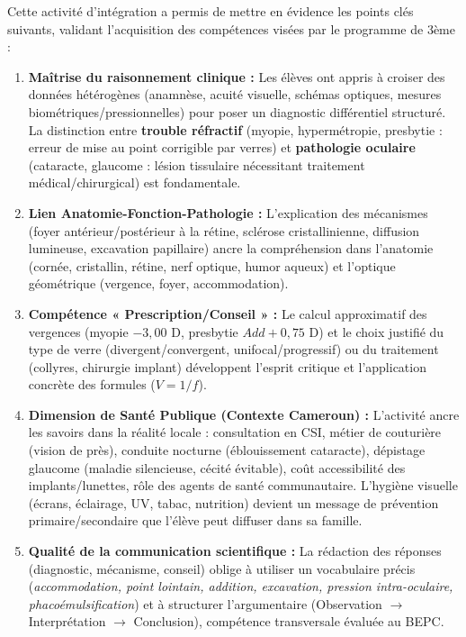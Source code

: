 \documentclass[11pt]{article}
\newcounter{popsec}
\newcounter{popsub}
\newcommand{\courssub}[1]{%
  \stepcounter{popsub}%
  \par\vspace{9pt}\noindent{\popxbold\fontsize{11.5}{13}\selectfont\color{popink}{\color{poporange}\thepopsec.\thepopsub}\hspace{6pt}#1}\par\nopagebreak\vspace{4pt}
}
\begin{document}
\courssub{Bilan de l'activité et Synthèse de la leçon}
Cette activité d'intégration a permis de mettre en évidence les points clés suivants, validant l'acquisition des compétences visées par le programme de 3ème :

\begin{enumerate}
    \item \textbf{Maîtrise du raisonnement clinique :} Les élèves ont appris à croiser des données hétérogènes (anamnèse, acuité visuelle, schémas optiques, mesures biométriques/pressionnelles) pour poser un diagnostic différentiel structuré. La distinction entre \textbf{trouble réfractif} (myopie, hypermétropie, presbytie : erreur de mise au point corrigible par verres) et \textbf{pathologie oculaire} (cataracte, glaucome : lésion tissulaire nécessitant traitement médical/chirurgical) est fondamentale.
    \item \textbf{Lien Anatomie-Fonction-Pathologie :} L'explication des mécanismes (foyer antérieur/postérieur à la rétine, sclérose cristallinienne, diffusion lumineuse, excavation papillaire) ancre la compréhension dans l'anatomie (cornée, cristallin, rétine, nerf optique, humor aqueux) et l'optique géométrique (vergence, foyer, accommodation).
    \item \textbf{Compétence « Prescription/Conseil » :} Le calcul approximatif des vergences (myopie $-3,00$ D, presbytie $Add +0,75$ D) et le choix justifié du type de verre (divergent/convergent, unifocal/progressif) ou du traitement (collyres, chirurgie implant) développent l'esprit critique et l'application concrète des formules ($V = 1/f$).
    \item \textbf{Dimension de Santé Publique (Contexte Cameroun) :} L'activité ancre les savoirs dans la réalité locale : consultation en CSI, métier de couturière (vision de près), conduite nocturne (éblouissement cataracte), dépistage glaucome (maladie silencieuse, cécité évitable), coût accessibilité des implants/lunettes, rôle des agents de santé communautaire. L'hygiène visuelle (écrans, éclairage, UV, tabac, nutrition) devient un message de prévention primaire/secondaire que l'élève peut diffuser dans sa famille.
    \item \textbf{Qualité de la communication scientifique :} La rédaction des réponses (diagnostic, mécanisme, conseil) oblige à utiliser un vocabulaire précis (\emph{accommodation, point lointain, addition, excavation, pression intra-oculaire, phacoémulsification}) et à structurer l'argumentaire (Observation $\rightarrow$ Interprétation $\rightarrow$ Conclusion), compétence transversale évaluée au BEPC.
\end{enumerate}
\end{document}
